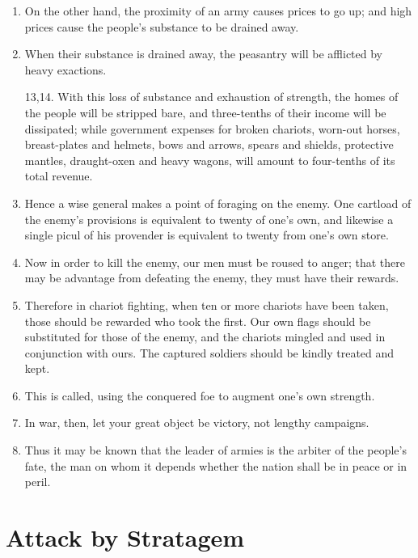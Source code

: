 \begin{enumerate}
\item On the other hand, the proximity of an army causes
    prices to go up; and high prices cause the people's
    substance to be drained away.

\item When their substance is drained away, the peasantry
    will be afflicted by heavy exactions.

13,14. With this loss of substance and exhaustion
    of strength, the homes of the people will be stripped bare,
    and three-tenths of their income will be dissipated;
    while government expenses for broken chariots, worn-out horses,
    breast-plates and helmets, bows and arrows, spears and shields,
    protective mantles, draught-oxen and heavy wagons,
    will amount to four-tenths of its total revenue.

\item Hence a wise general makes a point of foraging
    on the enemy.  One cartload of the enemy's provisions
    is equivalent to twenty of one's own, and likewise
    a single picul of his provender is equivalent to twenty
    from one's own store.

\item Now in order to kill the enemy, our men must
    be roused to anger; that there may be advantage from
    defeating the enemy, they must have their rewards.

\item Therefore in chariot fighting, when ten or more chariots
    have been taken, those should be rewarded who took the first. 
    Our own flags should be substituted for those of the enemy,
    and the chariots mingled and used in conjunction with ours. 
    The captured soldiers should be kindly treated and kept.

\item This is called, using the conquered foe to augment
    one's own strength.

\item In war, then, let your great object be victory,
    not lengthy campaigns.

\item Thus it may be known that the leader of armies
    is the arbiter of the people's fate, the man on whom it
    depends whether the nation shall be in peace or in peril.

\end{enumerate}

\addtocounter{chapter}{1}\chapter*{Attack by Stratagem}


